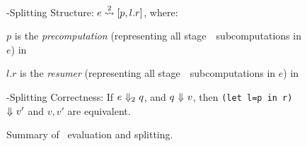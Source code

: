 \begin{figure*}
\hspace{2em}\bbtwo-Splitting Structure: $e \overset{ 2}\rightsquigarrow [p,l.r]$, where:

\hspace{4em}$p$ is the \emph{precomputation}
(representing all stage~\bbone\ subcomputations in $e$)
in \langmono

\hspace{4em}$l.r$ is the \emph{resumer}
(representing all stage~\bbtwo\ subcomputations in $e$)
in \langmono

\hspace{2em}\bbtwo-Splitting Correctness:
If $e~{\Downarrow_{ 2}}~q$, and $q~{\Downarrow}~v$, then
\texttt{(let l=p in r)}~${\Downarrow}~v'$ and $v,v'$ are equivalent.

\caption{Summary of \lang\ evaluation and splitting.}
\label{fig:termSplitSummary}
\end{figure*}

